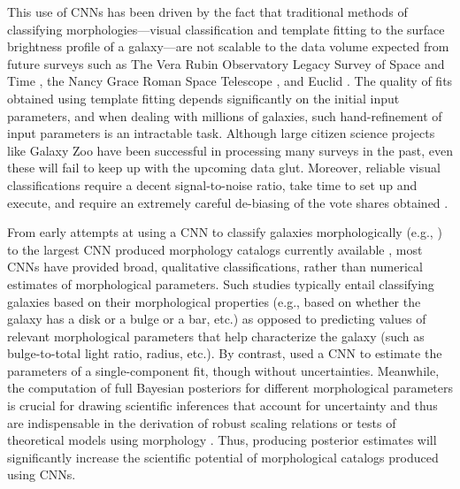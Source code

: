 This use of CNNs has been driven by the fact that traditional methods of classifying morphologies---visual classification and template fitting to the surface brightness profile of a galaxy---are not scalable to the data volume expected from future surveys such as The Vera Rubin Observatory Legacy Survey of Space and Time \citep[LSST;][]{lsst}, the Nancy Grace Roman Space Telescope \citep[NGRST;][]{ngrst}, and Euclid \citep{euclid}. The quality of fits obtained using template fitting depends significantly on the initial input parameters, and when dealing with millions of galaxies, such hand-refinement of input parameters is an intractable task. Although large citizen science projects like Galaxy Zoo \citep{gzoo_original} have been successful in processing many surveys in the past, even these will fail to keep up with the upcoming data glut. Moreover, reliable visual classifications require a decent signal-to-noise ratio, take time to set up and execute, and require an extremely careful de-biasing of the vote shares obtained \citep[e.g.,][]{gzoo_original,gzoo_candels}. 

From early attempts at using a CNN to classify galaxies morphologically (e.g.,  \citealp{Dieleman2015Rotation-invariantPrediction}) to the largest CNN produced morphology catalogs currently available \citep{Cheng2021GalaxyNetworks, Vega-Ferrero2021PushingSurvey}, most
CNNs have provided broad, qualitative classifications, rather than 
numerical estimates of morphological parameters. Such studies typically entail classifying galaxies based on their morphological properties (e.g., based on whether the galaxy has a disk or a bulge or a bar, etc.) as opposed to predicting values of relevant morphological parameters that help characterize the galaxy (such as bulge-to-total light ratio, radius, etc.).
By contrast, \citet{Tuccillo2018DeepFitting} used a CNN to estimate the parameters of a single-component \sersic{} fit, though  without uncertainties. 
Meanwhile, the computation of full Bayesian posteriors for different morphological parameters is crucial for drawing scientific inferences that account for uncertainty and thus are indispensable in 
the derivation of robust scaling relations  \citep[e.g.,][]{Bernardi2013TheProfile, vanderWel20143D-HST+CANDELS:3} or tests of theoretical models using morphology \citep[e.g.,][]{Schawinski2014TheGalaxies}. Thus, producing posterior estimates will significantly increase the scientific potential of morphological catalogs produced using CNNs.

